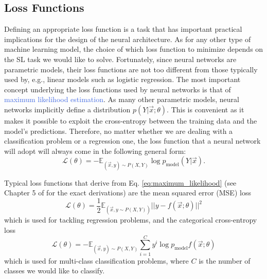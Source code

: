 \subsection{Loss Functions}
\label{sec:loss_functions}
Defining an appropriate loss function is a task that has important practical implications for the design of the neural architecture. As for any other type of machine learning model, the choice of which loss function to minimize depends on the SL task we would like to solve. Fortunately, since neural networks are parametric models, their loss functions are not too different from those typically used by, e.g.,  linear models such as logistic regression. The most important concept underlying the loss functions used by neural networks is that of \textcolor{RoyalBlue}{maximum likelihood estimation}. As many other parametric models, neural networks implicitly define a distribution $p(Y|\vec{x};\theta)$. This is convenient as it makes it possible to exploit the cross-entropy between the training data and the model's predictions. Therefore, no matter whether we are dealing with a classification problem or a regression one, the loss function that a neural network will adopt will always come in the following general form:
\begin{equation}
	\mathscr{L}(\theta) = - \mathds{E}_{(\vec{x},y)\sim P(X,Y)} \log p_\text{model} (Y|\vec{x}).
	\label{eq:maximum_likelihood}
\end{equation}

Typical loss functions that derive from Eq. \ref{eq:maximum_likelihood} (see Chapter 5 of \cite{goodfellow2016deep} for the exact derivations) are the mean squared error (MSE) loss
\begin{equation}
	\mathscr{L}(\theta) = \frac{1}{2}\mathds{E}_{(\vec{x},y\sim P(X,Y))} ||y - f(\vec{x};\theta) ||^{2}
	\label{eq:mean_squared_error}
\end{equation}
which is used for tackling regression problems, and the categorical cross-entropy loss
\begin{equation}
	\mathscr{L}(\theta) = - \mathds{E}_{(\vec{x},y)\sim P(X,Y)} \sum_{i=1}^{C} y^{i} \log p_\text{model} f(\vec{x};\theta)
	\label{eq:cross_entropy}
\end{equation}
which is used for multi-class classification problems, where $C$ is the number of classes we would like to classify. 

